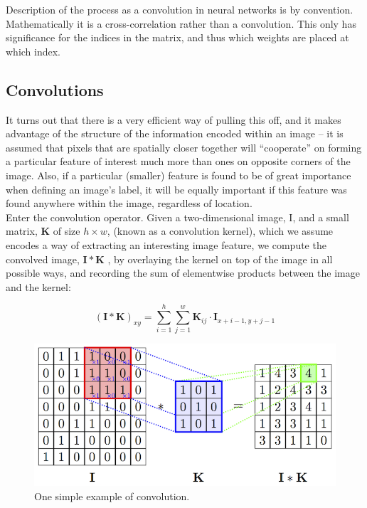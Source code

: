     Description of the process as a convolution in neural networks is by convention. Mathematically it is a cross-correlation rather than a convolution. This only has significance for the indices in the matrix, and thus which weights are placed at which index. 

    \subsection{Convolutions}
    It turns out that there is a very efficient way of pulling this off, and it makes advantage of the structure of the information encoded within an image – it is assumed that pixels that are spatially closer together will ``cooperate'' on forming a particular feature of interest much more than ones on opposite corners of the image. Also, if a particular (smaller) feature is found to be of great importance when defining an image's label, it will be equally important if this feature was found anywhere within the image, regardless of location. \\

    Enter the convolution operator. Given a two-dimensional image, I, and a small matrix, $\pmb{K}$ of size $h \times w$, (known as a convolution kernel), which we assume encodes a way of extracting an interesting image feature, we compute the convolved image, $\pmb{I} * \pmb{K}$ , by overlaying the kernel on top of the image in all possible ways, and recording the sum of elementwise products between the image and the kernel:

    \begin{equation}
        (\pmb{I} * \pmb{K})_{xy} = \sum_{i=1}^{h}\sum_{j=1}^{w} \pmb{K}_{ij}\cdot \pmb{I}_{x+i-1, y+j-1}
    \end{equation}

    \begin{figure}[!h]
        \centering
        \includegraphics[scale=1.3]{Figures/convolve.png}
        \caption{One simple example of convolution.}
        \label{con}
    \end{figure}

